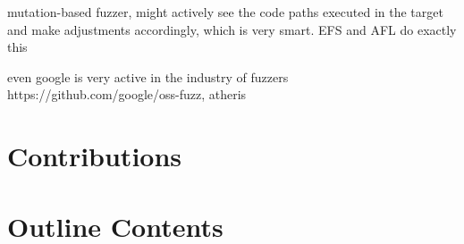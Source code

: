 mutation-based fuzzer, might actively see the code paths executed in the target and make adjustments accordingly, which is very smart. EFS and AFL do exactly this

even google is very active in the industry of fuzzers https://github.com/google/oss-fuzz, atheris


\section{Contributions}

\section{Outline Contents}